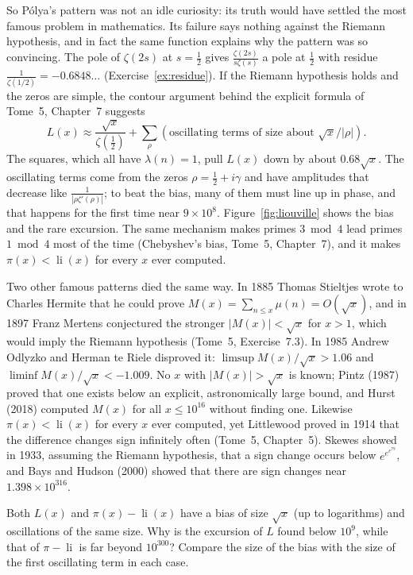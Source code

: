 So P\'olya's pattern was not an idle curiosity: its truth would have settled the most famous problem in mathematics. Its failure says nothing against the
Riemann hypothesis, and in fact the same function explains why the pattern was so convincing. The pole of $\zeta(2s)$ at $s=\frac12$ gives $\frac{\zeta(2s)}{s\zeta(s)}$ a pole at $\frac12$ with
residue $\frac1{\zeta(1/2)}=-0.6848\ldots$ (Exercise~\ref{ex:residue}). If the Riemann hypothesis holds and the zeros are simple, the contour argument behind the
explicit formula of Tome~5, Chapter~7 suggests
\[
L(x)\approx\frac{\sqrt x}{\zeta(\frac12)}+\sum_\rho(\text{oscillating terms of size about }\sqrt x/|\rho|).
\]
The squares, which all have $\lambda(n)=1$, pull $L(x)$ down by about $0.68\sqrt x$. The oscillating terms come from the zeros $\rho=\frac12+i\gamma$ and have
amplitudes that decrease like $\frac1{|\rho\zeta'(\rho)|}$; to beat the bias, many of them must line up in phase, and that happens for the first time near
$9\times10^8$. Figure~\ref{fig:liouville} shows the bias and the rare excursion. The same mechanism makes primes $3\bmod4$ lead primes $1\bmod4$ most of the time
(Chebyshev's bias, Tome~5, Chapter~7), and it makes $\pi(x)<\operatorname{li}(x)$ for every $x$ ever computed.

\begin{remark}
Two other famous patterns died the same way. In 1885 Thomas Stieltjes wrote to Charles Hermite that he could prove $M(x)=\sum_{n\le x}\mu(n)=O(\sqrt x)$, and
in 1897 Franz Mertens conjectured the stronger $|M(x)|<\sqrt x$ for $x>1$, which would imply the Riemann hypothesis (Tome~5, Exercise~7.3). In 1985 Andrew
Odlyzko and Herman te Riele disproved it: $\limsup M(x)/\sqrt x>1.06$ and $\liminf M(x)/\sqrt x<-1.009$. No $x$ with $|M(x)|>\sqrt x$ is known; Pintz (1987) proved
that one exists below an explicit, astronomically large bound, and Hurst (2018) computed $M(x)$ for all $x\le10^{16}$ without finding one. Likewise
$\pi(x)<\operatorname{li}(x)$ for every $x$ ever computed, yet Littlewood proved in 1914 that the difference changes sign infinitely often (Tome~5, Chapter~5).
Skewes showed in 1933, assuming the Riemann hypothesis, that a sign change occurs below $e^{e^{e^{79}}}$, and Bays and Hudson (2000) showed that there are sign
changes near $1.398\times10^{316}$.
\end{remark}

\begin{think}
Both $L(x)$ and $\pi(x)-\operatorname{li}(x)$ have a bias of size $\sqrt x$ (up to logarithms) and oscillations of the same size. Why is the excursion of $L$
found below $10^9$, while that of $\pi-\operatorname{li}$ is far beyond $10^{300}$? Compare the size of the bias with the size of the first oscillating term in each
case.
\end{think}

